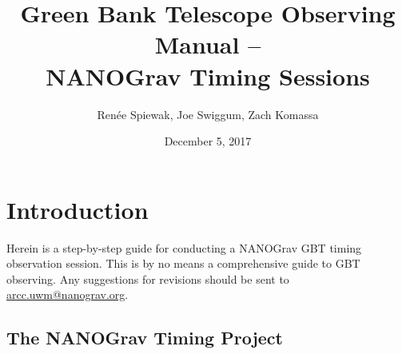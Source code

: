 \documentclass[11pt, reqno, tbtags]{article}
\begin{document}
\title{Green Bank Telescope Observing Manual -- \\
 NANOGrav Timing Sessions}
\author{Ren\'ee Spiewak, Joe Swiggum, Zach Komassa}

\date{December 5, 2017}                                           %

\maketitle 
{}
\tableofcontents


\section{Introduction}  %
Herein is a step-by-step guide for conducting a NANOGrav GBT timing observation session. This is by no means a comprehensive guide to GBT observing.  Any suggestions for revisions should be sent to \href{mailto:arcc.uwm@nanograv.org}{arcc.uwm@nanograv.org}.  

\subsection{The NANOGrav Timing Project} %
\end{document}
